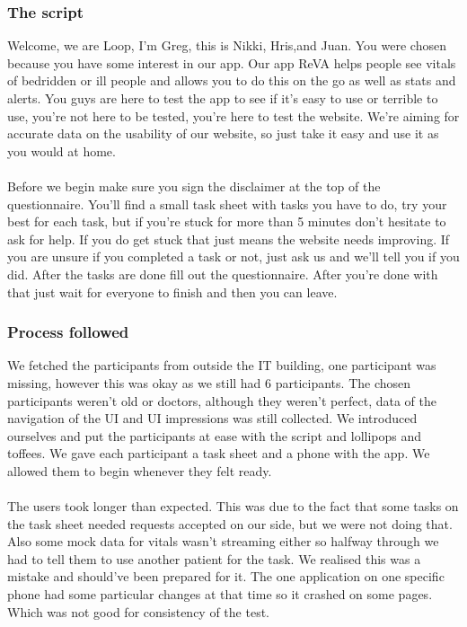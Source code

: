 \documentclass[12pt]{article}
\begin{document}
{		\subsubsection{The script}
		Welcome, we are Loop, I’m Greg, this is Nikki, Hris,and Juan. You were chosen because you have some interest in our app. Our app ReVA helps people see vitals of bedridden or ill people and allows you to do this on the go as well as stats and alerts. You guys are here to test the app to see if it’s easy to use or terrible to use, you’re not here to be tested, you’re here to test the website. We’re aiming for accurate data on the usability of our website, so just take it easy and use it as you would at home. \\ \\
Before we begin make sure you sign the disclaimer at the top of the questionnaire. You’ll find a small task sheet with tasks you have to do, try your best for each task, but if you’re stuck for more than 5 minutes don’t hesitate to ask for help. If you do get stuck that just means the website needs improving. If you are unsure if you completed a task or not, just ask us and we’ll tell you if you did. After the tasks are done fill out the questionnaire. After you’re done with that just wait for everyone to finish and then you can leave.
\subsubsection{Process followed}
We fetched the participants from outside the IT building, one participant was missing, however this was okay as we still had 6 participants. The chosen participants weren’t old or doctors, although they weren’t perfect, data of the navigation of the UI and UI impressions was still collected. We introduced ourselves and put the participants at ease with the script and lollipops and toffees. We gave each participant a task sheet and a phone with the app. We allowed them to begin whenever they felt ready. \\ \\
The users took longer than expected. This was due to the fact that some tasks on the task sheet needed requests accepted on our side, but we were not doing that. Also some mock data for vitals wasn’t streaming either so halfway through we had to tell them to use another patient for the task. We realised this was a mistake and should’ve been prepared for it. The one application on one specific phone had some particular changes at that time so it crashed on some pages. Which was not good for consistency of the test. 

}
\end{document}
